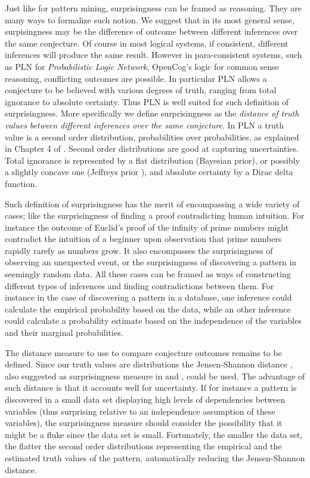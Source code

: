 \documentclass[runningheads]{llncs}
\begin{document}
Just like for pattern mining, surprisingness can be framed as
reasoning. They are many ways to formalize such notion. We suggest
that in its most general sense, surpisingness may be the difference of
outcome between different inferences over the same conjecture. Of
course in most logical systems, if consistent, different inferences
will produce the same result. However in para-consistent systems, such
as PLN \cite{Goertzel2009PLN} for \emph{Probabilistic Logic Network},
OpenCog's logic for common sense reasoning, conflicting outcomes are
possible. In particular PLN allows a conjecture to be believed with
various degrees of truth, ranging from total ignorance to absolute
certainty. Thus PLN is well suited for such definition of
surprisingness. More specifically we define surprisingness as the
\emph{distance of truth values between different inferences over the
  same conjecture}. In PLN a truth value is a second order
distribution, probabilities over probabilities, as explained in
Chapter 4 of \cite{Goertzel2009PLN}. Second order distributions are
good at capturing uncertainties. Total ignorance is represented by a
flat distribution (Bayesian prior), or possibly a slightly concave one
(Jeffreys prior \cite{Jeffreys46Invariant}), and absolute certainty by
a Dirac delta function.

Such definition of surprisingness has the merit of encompassing a wide
variety of cases; like the surprisingness of finding a proof
contradicting human intuition. For instance the outcome of Euclid's
proof of the infinity of prime numbers might contradict the intuition
of a beginner upon observation that prime numbers rapidly rarefy as
numbers grow. It also encompasses the surprisingness of observing an
unexpected event, or the surprisingness of discovering a pattern in
seemingly random data. All these cases can be framed as ways of
constructing different types of inferences and finding contradictions
between them. For instance in the case of discovering a pattern in a
database, one inference could calculate the empirical probability
based on the data, while an other inference could calculate a
probability estimate based on the independence of the variables and
their marginal probabilities.

The distance measure to use to compare conjecture outcomes remains to
be defined. Since our truth values are distributions the
Jensen-Shannon distance \cite{Endres2003A}, also suggested as
surprisingness measure in \cite{Pienta2015AN} and
\cite{DerezinskiRH18}, could be used. The advantage of such distance
is that it accounts well for uncertainty. If for instance a pattern is
discovered in a small data set displaying high levels of dependencies
between variables (thus surprising relative to an independence
assumption of these variables), the surprisingness measure should
consider the possibility that it might be a fluke since the data set
is small. Fortunately, the smaller the data set, the flatter the
second order distributions representing the empirical and the
estimated truth values of the pattern, automatically reducing the
Jensen-Shannon distance.
\end{document}
